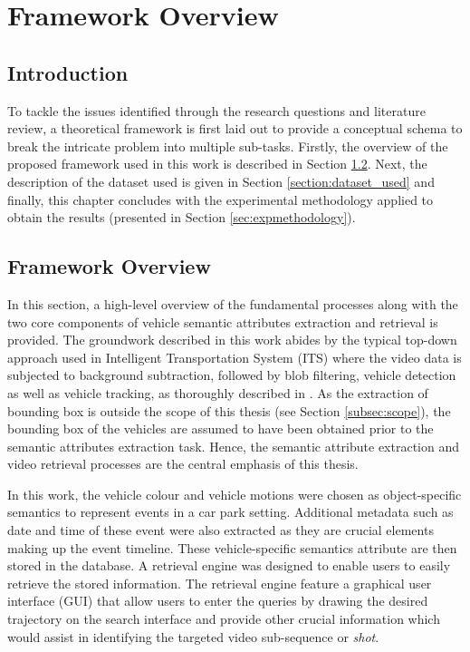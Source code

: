 \chapter{Framework Overview}
\label{chapter:framework}
\section{Introduction}
To tackle the issues identified through the research questions and literature review, a theoretical framework is first laid out to provide a conceptual schema to break the intricate problem into multiple sub-tasks. Firstly, the overview of the proposed framework used in this work is described in Section \ref{section:framework}. Next, the description of the dataset used is given in Section \ref{section:dataset_used} and finally, this chapter concludes with the experimental methodology applied to obtain the results (presented in Section \ref{sec:expmethodology}).


\section{Framework Overview}
\label{section:framework}
In this section, a high-level overview of the fundamental processes along with the two core components of vehicle semantic attributes extraction and retrieval is provided.
The groundwork described in this work abides by the typical top-down approach used in Intelligent Transportation System (ITS) where the video data is subjected to background subtraction, followed by blob filtering, vehicle detection as well as vehicle tracking, as thoroughly described in \cite{lim2017}.
As the extraction of bounding box is outside the scope of this thesis (see Section \ref{subsec:scope}), the bounding box of the vehicles are assumed to have been obtained prior to the semantic attributes extraction task. Hence, the semantic attribute extraction and video retrieval processes are the central emphasis of this thesis.

In this work, the vehicle colour and vehicle motions were chosen as object-specific semantics to represent events in a car park setting. Additional metadata such as date and time of these event were also extracted as they are crucial elements making up the event timeline. 
These vehicle-specific semantics attribute are then stored in the database.
A retrieval engine was designed to enable users to easily retrieve the stored information. The retrieval engine feature a graphical user interface (GUI) that allow users to enter the queries by drawing the desired trajectory on the search interface and provide other crucial information which would assist in identifying the targeted video sub-sequence or \emph{shot}.


